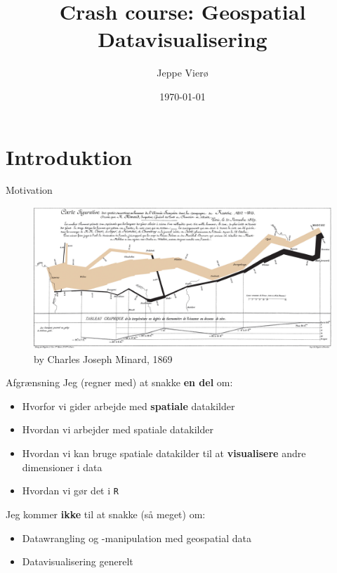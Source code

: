 \documentclass[
  8pt,
  ignorenonframetext,
  aspectratio=169]{beamer}
\title{Crash course: Geospatial Datavisualisering}
\author{Jeppe Vierø}
\date{\today}
\begin{document}
\frame{\titlepage}

\begin{frame}[allowframebreaks]
  \tableofcontents[hideallsubsections]
\end{frame}
\hypertarget{introduktion}{%
\section{Introduktion}\label{introduktion}}

\begin{frame}{Motivation}
\protect\hypertarget{motivation}{}
\begin{figure}[H]
    \centering
    \includegraphics[width=.90\textwidth]{pictures/Minard.png}
    \caption{by Charles Joseph Minard, 1869}
\end{figure}
\end{frame}

\begin{frame}[fragile]{Afgrænsning}
\protect\hypertarget{afgruxe6nsning}{}
Jeg (regner med) at snakke \textbf{en del} om:

\begin{itemize}
\item
  Hvorfor vi gider arbejde med \textbf{spatiale} datakilder
\item
  Hvordan vi arbejder med spatiale datakilder
\item
  Hvordan vi kan bruge spatiale datakilder til at \textbf{visualisere}
  andre dimensioner i data
\item
  Hvordan vi gør det i \texttt{R}
\end{itemize}

\bigskip

Jeg kommer \textbf{ikke} til at snakke (så meget) om:

\begin{itemize}
\item
  Datawrangling og -manipulation med geospatial data
\item
  Datavisualisering generelt
\end{itemize}
\end{frame}
\end{document}
